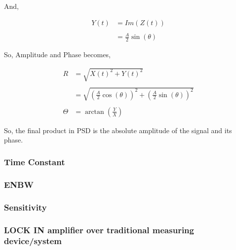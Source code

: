 \documentclass[12pt]{article}
\begin{document}
And,

\begin{align*}
Y(t) & = Im(Z(t))\\
\\
& =  \frac{A}{2}\sin(\theta)
\end{align*}

So, Amplitude and Phase becomes, 

\begin{align*}
R & = \sqrt{X(t)^2+Y(t)^2}\\
\\
& =  \sqrt{(\frac{A}{2}\cos(\theta))^2+(\frac{A}{2}\sin(\theta))^2}\\
\\
\Theta & = \arctan(\frac{Y}{X})
\end{align*}

So, the final product in PSD is the absolute amplitude of the signal and its phase. 

\subsubsection{Time Constant }

\subsubsection{ENBW}

\subsubsection{Sensitivity} 

\subsubsection{LOCK IN amplifier over traditional measuring device/system}
\end{document}
